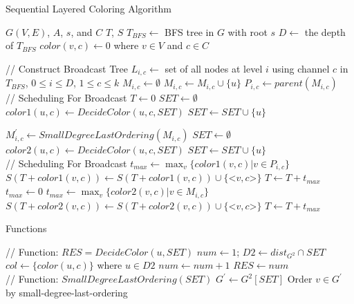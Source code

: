 \documentclass[10pt, conference]{IEEEtran}
\begin{document}
\begin{algorithm}[htb]
\caption{Sequential Layered Coloring Algorithm}
\label{A2-1}
\begin{algorithmic}[1]
\REQUIRE $G(V, E)$, $A$, $s$, and $C$
\ENSURE $T$, $S$
\STATE $T_{BFS} \leftarrow $ BFS tree in $G$ with root $s$
\STATE $D \leftarrow$ the depth of $T_{BFS}$
\STATE $color(v, c) \leftarrow 0$ where $v \in V$ and $c \in C$

// Construct Broadcast Tree
\STATE $L_{i,c} \leftarrow$ set of all nodes at level $i$ using channel $c$ in $T_{BFS}$, $0 \leq i \leq D$, $1 \leq c \leq k$
        \STATE $M_{i,c} \leftarrow \emptyset$
                \STATE $M_{i,c} \leftarrow M_{i,c} \cup \{u\}$
            \ENDIF
        \ENDFOR
\STATE $P_{i, c} \leftarrow parent(M_{i, c})$
    \ENDFOR
\ENDFOR\\
// Scheduling For Broadcast
\STATE $T \leftarrow 0$
        \STATE $SET \leftarrow \emptyset$
            \STATE $color1(u, c) \leftarrow DecideColor(u, c, SET)$
            \STATE $SET \leftarrow SET \cup \{u\}$
        \ENDFOR


        \STATE $M^{'}_{i,c} \leftarrow SmallDegreeLastOrdering(M_{i, c})$
        \STATE $SET \leftarrow \emptyset$
            \STATE $color2(u, c) \leftarrow DecideColor(u, c, SET)$
            \STATE $SET \leftarrow SET \cup \{u\}$
        \ENDFOR
    \ENDFOR
\ENDFOR\\
// Scheduling For Broadcast
        \STATE $t_{max} \leftarrow \max_v\{color1(v, c) | v \in P_{i,c}\}$
            \STATE $S(T+color1(v, c)) \leftarrow S(T+color1(v, c)) \cup \{$<$v, c$>$\} $
        \ENDFOR
        \STATE $T \leftarrow T + t_{max}$
    \ENDFOR
    \STATE $t_{max} \leftarrow 0$
            \STATE $t_{max} \leftarrow \max_v\{color2(v, c) | v \in M_{i,c}\}$
        \ENDIF
            \STATE $S(T+color2(v, c)) \leftarrow S(T+color2(v, c)) \cup \{$<$v, c$>$\} $
        \ENDFOR
    \ENDFOR
    \STATE $T \leftarrow T + t_{max}$
\ENDFOR
\end{algorithmic}
\end{algorithm}

\begin{algorithm}[htb]
\caption{Functions}
\begin{algorithmic}[1]
\STATE // Function: $RES = DecideColor(u, SET)$
\STATE $num \leftarrow 1$; $D2 \leftarrow dist_{G^2} \cap SET$
\STATE $col \leftarrow \{color(u, c)\}$ where $u \in D2$
    \STATE $num \leftarrow num + 1$
\ENDWHILE
\STATE $RES \leftarrow num$ \\
// Function: $SmallDegreeLastOrdering(SET)$
\STATE $G^{'} \leftarrow G^2 [SET]$
\STATE Order $v \in G^{'}$ by small-degree-last-ordering
\end{algorithmic}
\end{algorithm}
\fi
\end{document}
